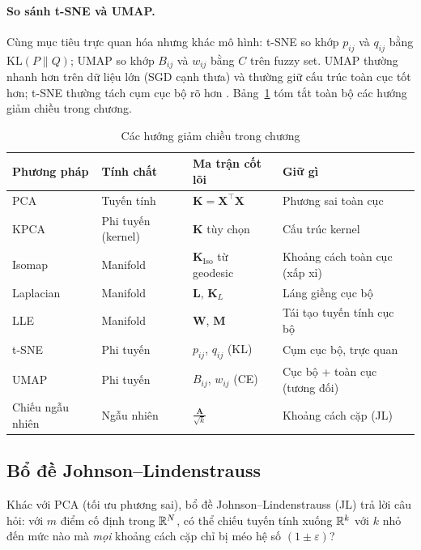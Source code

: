 \paragraph{So sánh t-SNE và UMAP.}
Cùng mục tiêu trực quan hóa nhưng khác mô hình: t-SNE so khớp $p_{ij}$ và $q_{ij}$ bằng $\mathrm{KL}(P\|Q)$; UMAP so khớp $B_{ij}$ và $w_{ij}$ bằng $C$ trên fuzzy set. UMAP thường nhanh hơn trên dữ liệu lớn (SGD cạnh thưa) và thường giữ cấu trúc toàn cục tốt hơn; t-SNE thường tách cụm cục bộ rõ hơn \cite{mcinnes2018umap,vandermaaten2008tsne}. Bảng~\ref{tab:dr-compare} tóm tắt toàn bộ các hướng giảm chiều trong chương.

\begin{table}[H]
\centering
\caption{Các hướng giảm chiều trong chương}
\label{tab:dr-compare}
\begin{tabular}{@{}llll@{}}
\toprule
Phương pháp & Tính chất & Ma trận cốt lõi & Giữ gì \\
\midrule
PCA & Tuyến tính & $\mathbf{K} = \mathbf{X}^\top\mathbf{X}$ & Phương sai toàn cục \\
KPCA & Phi tuyến (kernel) & $\mathbf{K}$ tùy chọn & Cấu trúc kernel \\
Isomap & Manifold & $\mathbf{K}_{\mathrm{Iso}}$ từ geodesic & Khoảng cách toàn cục (xấp xỉ) \\
Laplacian & Manifold & $\mathbf{L}$, $\mathbf{K}_L$ & Láng giềng cục bộ \\
LLE & Manifold & $\mathbf{W}$, $\mathbf{M}$ & Tái tạo tuyến tính cục bộ \\
t-SNE & Phi tuyến & $p_{ij}$, $q_{ij}$ (KL) & Cụm cục bộ, trực quan \\
UMAP & Phi tuyến & $B_{ij}$, $w_{ij}$ (CE) & Cục bộ + toàn cục (tương đối) \\
Chiếu ngẫu nhiên & Ngẫu nhiên & $\frac{\mathbf{A}}{\sqrt{k}}$ & Khoảng cách cặp (JL) \\
\bottomrule
\end{tabular}
\end{table}

\subsection{Bổ đề Johnson--Lindenstrauss}
\label{sec:jl}

Khác với PCA (tối ưu phương sai), bổ đề Johnson--Lindenstrauss (JL) trả lời câu hỏi: với $m$ điểm cố định trong $\mathbb{R}^N$, có thể chiếu tuyến tính xuống $\mathbb{R}^k$ với $k$ nhỏ đến mức nào mà \emph{mọi} khoảng cách cặp chỉ bị méo hệ số $(1 \pm \varepsilon)$? 

